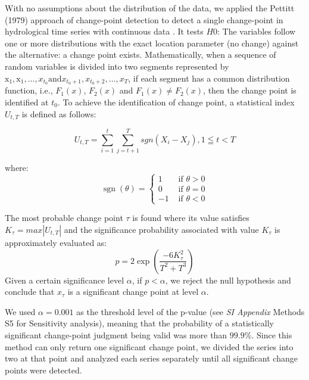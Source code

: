 		With no assumptions about the distribution of the data, we applied the Pettitt (1979) approach of change-point detection to detect a single change-point in hydrological time series with continuous data
        \cite{pettitt1979}.
		It tests $H0$: The variables follow one or more distributions with the exact location parameter (no change) against the alternative: a change point exists.
		Mathematically, when a sequence of random variables is divided into two segments represented by $\mathrm{x}_{1}, \mathrm{x}_{1}, \ldots, x_{t_{0}} \text{and} x_{t_{0}+1}, x_{t_{0}+2}, \ldots, x_{T}$, if each segment has a common distribution function, i.e., $F_1(x)$, $F_2(x)$ and $F_1(x) \neq F_2(x)$, then the change point is identified at $t_0$. To achieve the identification of change point, a statistical index $U_{t,T}$ is defined as follows:

		\begin{equation}
			U_{t, T} = \sum_{i=1}^t\sum_{j=t+1}^T sgn(X_i - X_j), 1 \leqq t < T
		\end{equation}

		where:
		\begin{equation}
			\operatorname{sgn}(\theta)= \begin{cases}1 & \text { if } \theta>0 \\ 0 & \text { if } \theta=0 \\ -1 & \text { if } \theta<0\end{cases}
		\end{equation}

		The most probable change point $\tau$ is found where its value satisfies $K_{\tau} = max|U_{t, T}|$ and the significance probability associated with value $K_{\tau}$ is approximately evaluated as:
		\begin{equation}
			p=2 \exp \left(\frac{-6 K_{\tau}^{2}}{T^{2}+T^{3}}\right)
		\end{equation}
		Given a certain significance level $\alpha$, if $p < \alpha$, we reject the null hypothesis and conclude that $x_{\tau}$ is a significant change point at level $\alpha$.

		We used $\alpha = 0.001$ as the threshold level of the p-value (see \textit{SI Appendix} Methods S5 for Sensitivity analysis), meaning that the probability of a statistically significant change-point judgment being valid was more than $99.9\%$.
		Since this method can only return one significant change point, we divided the series into two at that point and analyzed each series separately until all significant change points were detected.

